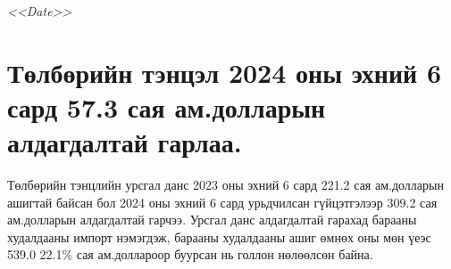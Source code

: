 
\begin{flushright}
    \textit{<<Date>>} %
\end{flushright}


\section*{Төлбөрийн тэнцэл 2024 оны эхний 6 сард 57.3 сая
ам.долларын алдагдалтай гарлаа.}

Төлбөрийн тэнцлийн урсгал данс 2023 оны эхний 6 сард 221.2 сая
ам.долларын ашигтай байсан бол 2024 оны эхний 6 сард урьдчилсан
гүйцэтгэлээр 309.2 сая ам.долларын алдагдалтай гарчээ. Урсгал данс алдагдалтай гарахад
барааны худалдааны импорт нэмэгдэж, барааны худалдааны ашиг өмнөх оны мөн үеэс 539.0
22.1\% сая ам.доллароор буурсан нь голлон нөлөөлсөн байна.